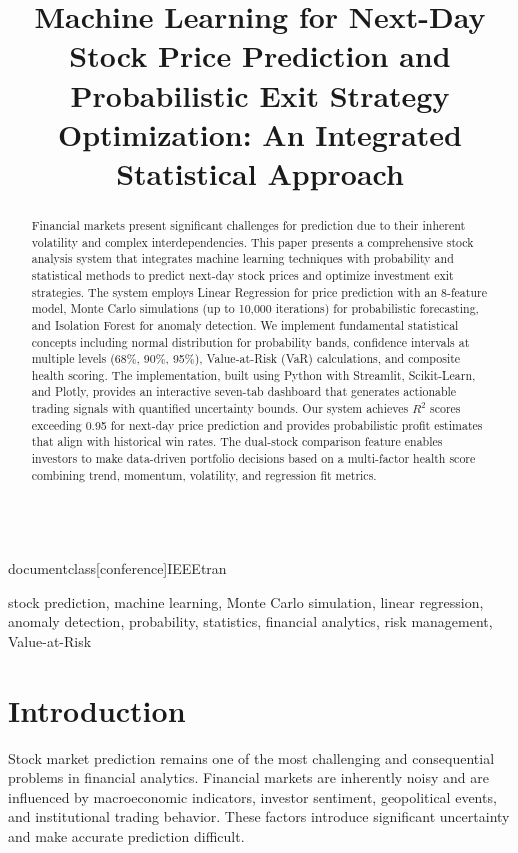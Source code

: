 \\documentclass[conference]{IEEEtran}
\begin{document}
\title{Machine Learning for Next-Day Stock Price Prediction and Probabilistic Exit Strategy Optimization: An Integrated Statistical Approach}

\author{
}

\maketitle

\begin{abstract}
Financial markets present significant challenges for prediction due to their inherent volatility and complex interdependencies. This paper presents a comprehensive stock analysis system that integrates machine learning techniques with probability and statistical methods to predict next-day stock prices and optimize investment exit strategies. The system employs Linear Regression for price prediction with an 8-feature model, Monte Carlo simulations (up to 10,000 iterations) for probabilistic forecasting, and Isolation Forest for anomaly detection. We implement fundamental statistical concepts including normal distribution for probability bands, confidence intervals at multiple levels (68\%, 90\%, 95\%), Value-at-Risk (VaR) calculations, and composite health scoring. The implementation, built using Python with Streamlit, Scikit-Learn, and Plotly, provides an interactive seven-tab dashboard that generates actionable trading signals with quantified uncertainty bounds. Our system achieves $R^2$ scores exceeding 0.95 for next-day price prediction and provides probabilistic profit estimates that align with historical win rates. The dual-stock comparison feature enables investors to make data-driven portfolio decisions based on a multi-factor health score combining trend, momentum, volatility, and regression fit metrics.
\end{abstract}

\begin{IEEEkeywords}
stock prediction, machine learning, Monte Carlo simulation, linear regression, anomaly detection, probability, statistics, financial analytics, risk management, Value-at-Risk
\end{IEEEkeywords}

\section{Introduction}
Stock market prediction remains one of the most challenging and consequential problems in financial analytics. Financial markets are inherently noisy and are influenced by macroeconomic indicators, investor sentiment, geopolitical events, and institutional trading behavior. These factors introduce significant uncertainty and make accurate prediction difficult.
\end{document}
